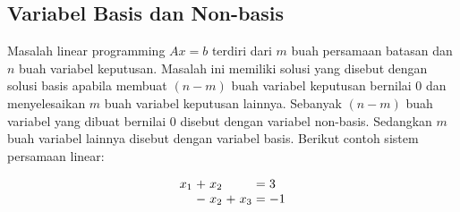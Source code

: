 		
		
		
		

\subsection{Variabel Basis dan Non-basis}
Masalah linear programming \(Ax = b\) terdiri dari \(m\) buah persamaan batasan dan \(n\) buah variabel keputusan. Masalah ini memiliki solusi yang disebut dengan solusi basis apabila membuat \((n - m)\) buah variabel keputusan bernilai 0 dan menyelesaikan \(m\) buah variabel keputusan lainnya. Sebanyak \((n - m)\) buah variabel yang dibuat bernilai 0 disebut dengan variabel non-basis. Sedangkan \(m\) buah variabel lainnya disebut dengan variabel basis. Berikut contoh sistem persamaan linear:

\begin{equation*}
	\setlength\arraycolsep{1.5pt}
	\begin{array}{r c r c r c l}
		x_1 &+ &x_2 &  &    &= &3\\
		    &- &x_2 &+ &x_3 &= &-1
	\end{array}
\end{equation*}

